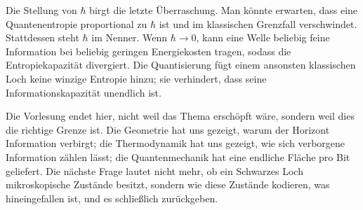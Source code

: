 \begin{classroomqa}
\end{classroomqa}

Die Stellung von \(\hbar\) birgt die letzte Überraschung. Man könnte erwarten, dass eine Quantenentropie proportional zu \(\hbar\) ist und im klassischen Grenzfall verschwindet. Stattdessen steht \(\hbar\) im Nenner. Wenn \(\hbar\to0\), kann eine Welle beliebig feine Information bei beliebig geringen Energiekosten tragen, sodass die Entropiekapazität divergiert. Die Quantisierung fügt einem ansonsten klassischen Loch keine winzige Entropie hinzu; sie verhindert, dass seine Informationskapazität unendlich ist.

\begin{classroomqa}
\end{classroomqa}

Die Vorlesung endet hier, nicht weil das Thema erschöpft wäre, sondern weil dies die richtige Grenze ist. Die Geometrie hat uns gezeigt, warum der Horizont Information verbirgt; die Thermodynamik hat uns gezeigt, wie sich verborgene Information zählen lässt; die Quantenmechanik hat eine endliche Fläche pro Bit geliefert. Die nächste Frage lautet nicht mehr, ob ein Schwarzes Loch mikroskopische Zustände besitzt, sondern wie diese Zustände kodieren, was hineingefallen ist, und es schließlich zurückgeben.